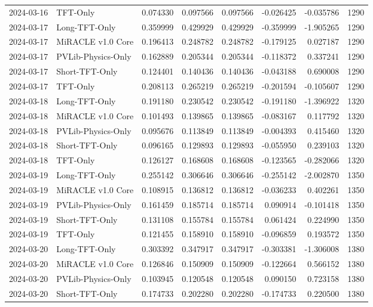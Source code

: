 \begin{tabular}{llrrrrrr}
2024-03-16 & TFT-Only & 0.074330 & 0.097566 & 0.097566 & -0.026425 & -0.035786 & 1290 \\
2024-03-17 & Long-TFT-Only & 0.359999 & 0.429929 & 0.429929 & -0.359999 & -1.905265 & 1290 \\
2024-03-17 & MiRACLE v1.0 Core & 0.196413 & 0.248782 & 0.248782 & -0.179125 & 0.027187 & 1290 \\
2024-03-17 & PVLib-Physics-Only & 0.162889 & 0.205344 & 0.205344 & -0.118372 & 0.337241 & 1290 \\
2024-03-17 & Short-TFT-Only & 0.124401 & 0.140436 & 0.140436 & -0.043188 & 0.690008 & 1290 \\
2024-03-17 & TFT-Only & 0.208113 & 0.265219 & 0.265219 & -0.201594 & -0.105607 & 1290 \\
2024-03-18 & Long-TFT-Only & 0.191180 & 0.230542 & 0.230542 & -0.191180 & -1.396922 & 1320 \\
2024-03-18 & MiRACLE v1.0 Core & 0.101493 & 0.139865 & 0.139865 & -0.083167 & 0.117792 & 1320 \\
2024-03-18 & PVLib-Physics-Only & 0.095676 & 0.113849 & 0.113849 & -0.004393 & 0.415460 & 1320 \\
2024-03-18 & Short-TFT-Only & 0.096165 & 0.129893 & 0.129893 & -0.055950 & 0.239103 & 1320 \\
2024-03-18 & TFT-Only & 0.126127 & 0.168608 & 0.168608 & -0.123565 & -0.282066 & 1320 \\
2024-03-19 & Long-TFT-Only & 0.255142 & 0.306646 & 0.306646 & -0.255142 & -2.002870 & 1350 \\
2024-03-19 & MiRACLE v1.0 Core & 0.108915 & 0.136812 & 0.136812 & -0.036233 & 0.402261 & 1350 \\
2024-03-19 & PVLib-Physics-Only & 0.161459 & 0.185714 & 0.185714 & 0.090914 & -0.101418 & 1350 \\
2024-03-19 & Short-TFT-Only & 0.131108 & 0.155784 & 0.155784 & 0.061424 & 0.224990 & 1350 \\
2024-03-19 & TFT-Only & 0.121455 & 0.158910 & 0.158910 & -0.096859 & 0.193572 & 1350 \\
2024-03-20 & Long-TFT-Only & 0.303392 & 0.347917 & 0.347917 & -0.303381 & -1.306008 & 1380 \\
2024-03-20 & MiRACLE v1.0 Core & 0.126846 & 0.150909 & 0.150909 & -0.122664 & 0.566152 & 1380 \\
2024-03-20 & PVLib-Physics-Only & 0.103945 & 0.120548 & 0.120548 & 0.090150 & 0.723158 & 1380 \\
2024-03-20 & Short-TFT-Only & 0.174733 & 0.202280 & 0.202280 & -0.174733 & 0.220500 & 1380 \\

\end{tabular}
